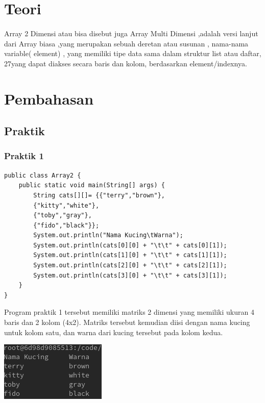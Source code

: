 \documentclass[a4paper,12pt]{article}
\begin{document}
\section{Teori}
\paragraph{}
Array 2 Dimensi atau bisa disebut juga Array Multi Dimensi ,adalah versi lanjut
dari Array biasa ,yang merupakan sebuah deretan atau susunan , nama-nama
variable( element) , yang memiliki tipe data sama dalam struktur list atau daftar,
27yang dapat diakses secara baris dan kolom, berdasarkan element/indexnya.

\newpage

\section{Pembahasan}
\subsection{Praktik}
\subsubsection{Praktik 1}
\begin{lstlisting}
public class Array2 {
    public static void main(String[] args) {
        String cats[][]= {{"terry","brown"},
        {"kitty","white"},
        {"toby","gray"},
        {"fido","black"}};
        System.out.println("Nama Kucing\tWarna");
        System.out.println(cats[0][0] + "\t\t" + cats[0][1]);
        System.out.println(cats[1][0] + "\t\t" + cats[1][1]);
        System.out.println(cats[2][0] + "\t\t" + cats[2][1]);
        System.out.println(cats[3][0] + "\t\t" + cats[3][1]);
    }
}
\end{lstlisting}
Program praktik 1 tersebut memiliki matriks 2 dimensi yang memiliki ukuran 4 baris dan 2 kolom (4x2). Matriks tersebut kemudian diisi dengan nama kucing untuk 
kolom satu, dan warna dari kucing tersebut pada kolom kedua.
\begin{center}
    \includegraphics{1.png}
\end{center}
\end{document}
